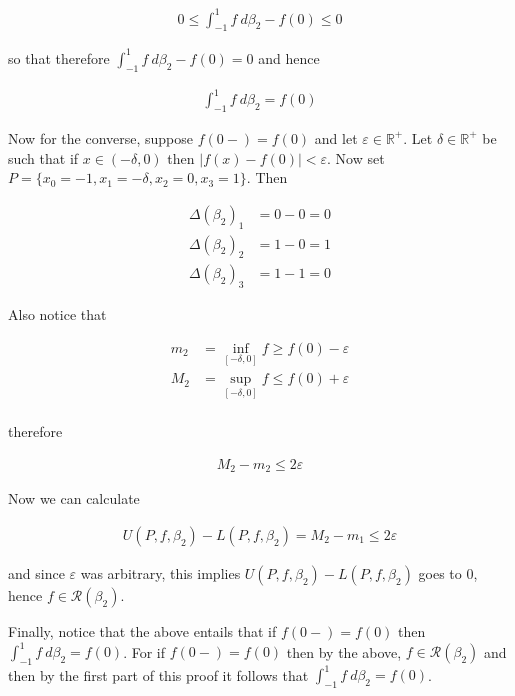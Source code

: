 \documentclass{article}
\begin{document}
  \begin{align*}
    0\leq \int_{-1}^1 f \ d\beta_2 - f(0)\leq 0
  \end{align*}

  so that therefore $\int_{-1}^1 f \ d\beta_2-f(0)=0$ and hence

  \begin{align*}
    \int_{-1}^1 f \ d\beta_2=f(0)
  \end{align*}

  \vspace{1cm}

  Now for the converse, suppose $f(0-)=f(0)$ and let $\varepsilon\in\mathbb R^+$.  Let $\delta\in\mathbb R^+$ be such that if $x\in(-\delta,0)$ then $|f(x)-f(0)|<\varepsilon$.  Now set $P=\{x_0=-1,x_1=-\delta,x_2=0,x_3=1\}$.  Then

  \begin{align*}
    \Delta(\beta_2)_1 &= 0-0=0 \\
    \Delta(\beta_2)_2 &= 1-0=1 \\
    \Delta(\beta_2)_3 &= 1-1=0
  \end{align*}

  Also notice that

  \begin{align*}
    m_2&=\displaystyle\inf_{[-\delta,0]}f\geq f(0)-\varepsilon\\
    M_2&=\displaystyle\sup_{[-\delta,0]}f\leq f(0)+\varepsilon\\
  \end{align*}

  therefore

  \begin{align*}
    M_2-m_2 \leq 2\varepsilon
  \end{align*}

  Now we can calculate

  \begin{align*}
    U(P,f,\beta_2)-L(P,f,\beta_2) = M_2-m_1\leq 2\varepsilon
  \end{align*}

  and since $\varepsilon$ was arbitrary, this implies $U(P,f,\beta_2)-L(P,f,\beta_2)$ goes to 0, hence $f\in\mathscr R(\beta_2)$.

  \vspace{1cm}

  Finally, notice that the above entails that if $f(0-)=f(0)$ then $\int_{-1}^1 f\ d\beta_2 = f(0)$.  For if $f(0-)=f(0)$ then by the above, $f\in\mathscr R(\beta_2)$ and then by the first part of this proof it follows that $\int_{-1}^1 f\ d\beta_2=f(0)$.
\end{document}
